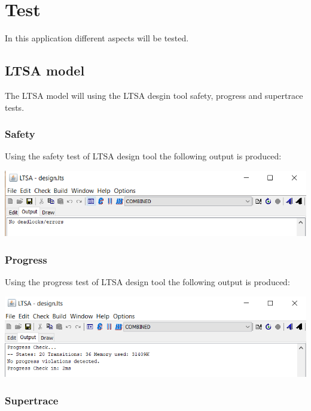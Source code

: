 \hypertarget{test}{%
\chapter{Test}\label{test}}

In this application different aspects will be tested.

\hypertarget{ltsa-model}{%
\section{LTSA model}\label{ltsa-model}}

The LTSA model will using the LTSA desgin tool safety, progress and
supertrace tests.

\hypertarget{safety}{%
\subsection{Safety}\label{safety}}

Using the safety test of LTSA design tool the following output is
produced:

\includegraphics{../img/safety.png}

\hypertarget{progress}{%
\subsection{Progress}\label{progress}}

Using the progress test of LTSA design tool the following output is
produced:

\includegraphics{../img/progress.png}

\hypertarget{supertrace}{%
\subsection{Supertrace}\label{supertrace}}

